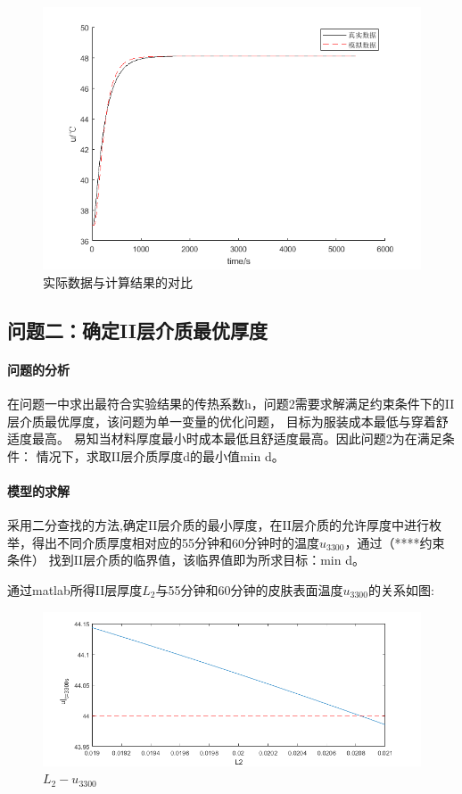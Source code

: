 \documentclass{cumcmthesis}
\begin{document}
        \begin{figure}[h] 
            \centering 
            \includegraphics[scale=0.9]{../figure/ques1result.png} 
            \caption{实际数据与计算结果的对比}\label{cou}    
        \end{figure}


    \subsection{问题二：确定II层介质最优厚度} 
        \paragraph{问题的分析} 
       
        
     在问题一中求出最符合实验结果的传热系数h，问题2需要求解满足约束条件下的II层介质最优厚度，该问题为单一变量的优化问题，
     目标为服装成本最低与穿着舒适度最高。
    易知当材料厚度最小时成本最低且舒适度最高。因此问题2为在满足条件：
    情况下，求取II层介质厚度d的最小值min d。
        \paragraph{模型的求解}
        采用二分查找的方法,确定II层介质的最小厚度，在II层介质的允许厚度中进行枚举，得出不同介质厚度相对应的55分钟和60分钟时的温度\(u_{3300}\)，通过（****约束条件）
    找到II层介质的临界值，该临界值即为所求目标：min d。

    通过matlab所得II层厚度\(L_2\)与55分钟和60分钟的皮肤表面温度\(u_{3300}\)的关系如图:

    \begin{figure}[h] 
        \centering 
        \includegraphics[scale=0.9]{../figure/ques2result.png} 
        \caption{\(L_2 - u_{3300}\)}\label{fig:one}    
    \end{figure}
\end{document}

